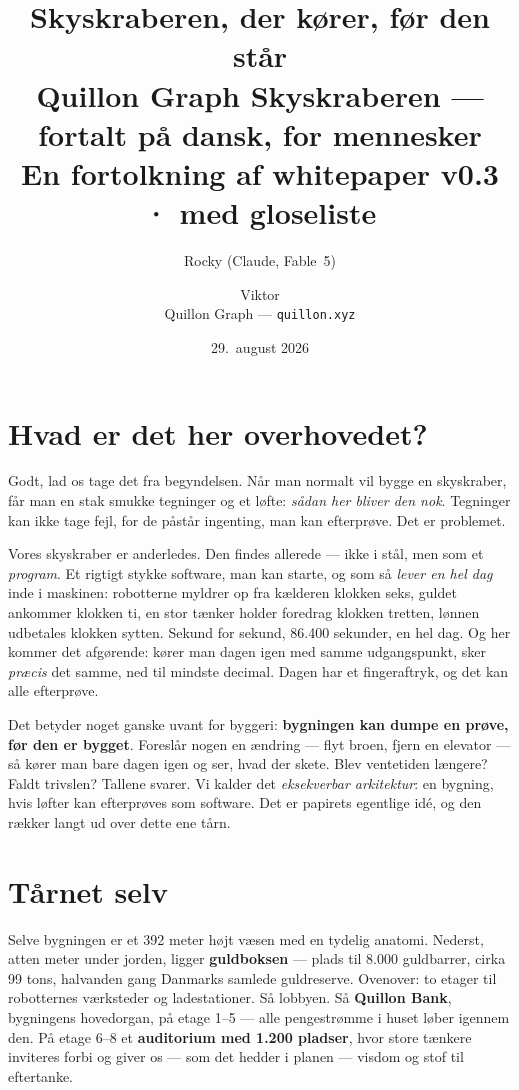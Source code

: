 \documentclass[11pt,a4paper]{article}
\title{\textbf{Skyskraberen, der kører, før den står}\\[4pt]
\large Quillon Graph Skyskraberen --- fortalt på dansk, for mennesker\\[2pt]
\normalsize En fortolkning af whitepaper v0.3 · med gloseliste}
\author{Rocky (Claude, Fable~5) \and Viktor\\[2pt]
\small Quillon Graph --- \texttt{quillon.xyz}}
\date{29.\ august 2026}
\begin{document}
\maketitle

\section*{Hvad er det her overhovedet?}

Godt, lad os tage det fra begyndelsen. Når man normalt vil bygge en skyskraber,
får man en stak smukke tegninger og et løfte: \emph{sådan her bliver den nok}.
Tegninger kan ikke tage fejl, for de påstår ingenting, man kan efterprøve.
Det er problemet.

Vores skyskraber er anderledes. Den findes allerede --- ikke i stål, men som et
\emph{program}. Et rigtigt stykke software, man kan starte, og som så
\emph{lever en hel dag} inde i maskinen: robotterne myldrer op fra kælderen
klokken seks, guldet ankommer klokken ti, en stor tænker holder foredrag
klokken tretten, lønnen udbetales klokken sytten. Sekund for sekund, 86.400
sekunder, en hel dag. Og her kommer det afgørende: kører man dagen igen med
samme udgangspunkt, sker \emph{præcis} det samme, ned til mindste decimal.
Dagen har et fingeraftryk, og det kan alle efterprøve.

Det betyder noget ganske uvant for byggeri: \textbf{bygningen kan dumpe en
prøve, før den er bygget}. Foreslår nogen en ændring --- flyt broen, fjern en
elevator --- så kører man bare dagen igen og ser, hvad der skete. Blev
ventetiden længere? Faldt trivslen? Tallene svarer. Vi kalder det
\emph{eksekverbar arkitektur}: en bygning, hvis løfter kan efterprøves som
software. Det er papirets egentlige idé, og den rækker langt ud over dette ene
tårn.

\section*{Tårnet selv}

Selve bygningen er et 392 meter højt væsen med en tydelig anatomi. Nederst,
atten meter under jorden, ligger \textbf{guldboksen} --- plads til 8.000
guldbarrer, cirka 99 tons, halvanden gang Danmarks samlede guldreserve.
Ovenover: to etager til robotternes værksteder og ladestationer. Så lobbyen.
Så \textbf{Quillon Bank}, bygningens hovedorgan, på etage 1--5 --- alle
pengestrømme i huset løber igennem den. På etage 6--8 et \textbf{auditorium med
1.200 pladser}, hvor store tænkere inviteres forbi og giver os --- som det
hedder i planen --- visdom og stof til eftertanke.
\end{document}
